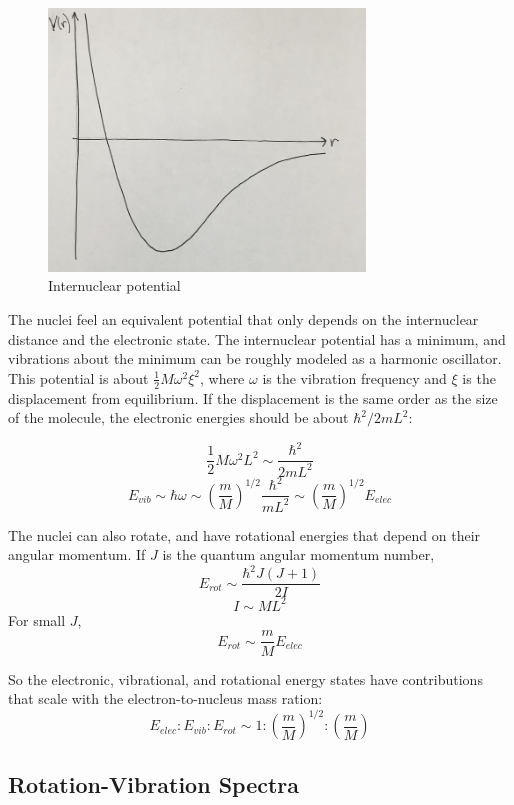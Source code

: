 \documentclass{article}
\begin{document}
\begin{figure}
    \centering
    \includegraphics[width=0.75\textwidth]{722px-Min.jpg}
    \caption{Internuclear potential}
    \label{fig:int_nuc_pot}
\end{figure}

The nuclei feel an equivalent potential that only depends on the internuclear distance and the electronic state. The internuclear potential has a minimum, and vibrations about the minimum can be roughly modeled as a harmonic oscillator. This potential is about $\frac{1}{2}M\omega^2 \xi^2$, where $\omega$ is the vibration frequency and $\xi$ is the displacement from equilibrium. If the displacement is the same order as the size of the molecule, the electronic energies should be about $\hbar^2 / 2mL^2$:

$$ \frac{1}{2} M \omega^2 L^2 \sim \frac{\hbar^2}{2mL^2} $$
$$E_{vib} \sim \hbar \omega \sim \left(\frac{m}{M}\right)^{1/2} \frac{\hbar^2}{mL^2} \sim \left(\frac{m}{M}\right)^{1/2} E_{elec} $$


The nuclei can also rotate, and have rotational energies that depend on their angular momentum. If $J$ is the quantum angular momentum number, 
$$ E_{rot} \sim \frac{\hbar^2 J (J+1)}{2I} $$
$$ I \sim M L^2 $$
For small $J$, 
$$ E_{rot} \sim \frac{m}{M} E_{elec} $$

So the electronic, vibrational, and rotational energy states have contributions that scale with the electron-to-nucleus mass ration:
$$ E_{elec} : E_{vib} : E_{rot} \sim 1: \left(\frac{m}{M}\right)^{1/2} : \left(\frac{m}{M}\right) $$


\subsection{Rotation-Vibration Spectra}
\end{document}
